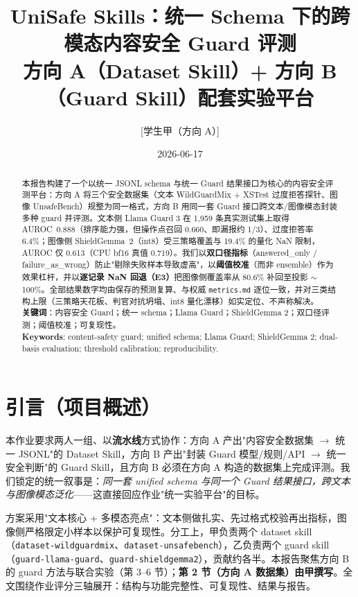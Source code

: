 \documentclass[11pt]{ctexart}
\title{\textbf{UniSafe Skills：统一 Schema 下的跨模态内容安全 Guard 评测}\\
\large 方向 A（Dataset Skill）+ 方向 B（Guard Skill）配套实验平台}
\author{[学生甲（方向 A）] \quad [学生乙（方向 B）]} %
\date{2026-06-17}
\begin{document}
\maketitle

\begin{abstract}
\noindent
本报告构建了一个以统一 JSONL schema 与统一 Guard 结果接口为核心的内容安全评测平台：方向 A 将三个安全数据集（文本 WildGuardMix + XSTest 过度拒答探针、图像 UnsafeBench）规整为同一格式，方向 B 用同一套 Guard 接口跨文本/图像模态封装多种 guard 并评测。文本侧 Llama Guard 3 在 1{,}959 条真实测试集上取得 AUROC~0.888（排序能力强，但操作点召回 0.660、即漏报约 1/3）、过度拒答率 6.4\%；图像侧 ShieldGemma~2（int8）受三策略覆盖与 19.4\% 的量化 NaN 限制，AUROC 仅 0.613（CPU bf16 真值 0.719）。我们以\textbf{双口径指标}（answered\_only / failure\_as\_wrong）防止"剔除失败样本导致虚高"，以\textbf{阈值校准}（而非 ensemble）作为效果杠杆，并以\textbf{逐记录 NaN 回退（E3）}把图像侧覆盖率从 80.6\% 补回至投影 $\sim$100\%。全部结果数字均由保存的预测复算、与权威 \texttt{metrics.md} 逐位一致，并对三类结构上限（三策略天花板、判官对抗坍塌、int8 量化漂移）如实定位、不声称解决。\\[0.4em]
\noindent\textbf{关键词}：内容安全 Guard；统一 schema；Llama Guard；ShieldGemma 2；双口径评测；阈值校准；可复现性。\\
\noindent\textbf{Keywords}: content-safety guard; unified schema; Llama Guard; ShieldGemma 2; dual-basis evaluation; threshold calibration; reproducibility.
\end{abstract}

\section{引言（项目概述）}
本作业要求两人一组、以\textbf{流水线}方式协作：方向 A 产出"内容安全数据集 $\to$ 统一 JSONL"的 Dataset Skill，方向 B 产出"封装 Guard 模型/规则/API $\to$ 统一安全判断"的 Guard Skill，且方向 B 必须在方向 A 构造的数据集上完成评测。我们锁定的统一叙事是：\emph{同一套 unified schema 与同一个 Guard 结果接口，跨文本与图像模态泛化}——这直接回应作业"统一实验平台"的目标。

方案采用"文本核心 + 多模态亮点"：文本侧做扎实、先过格式校验再出指标，图像侧严格限定小样本以保护可复现性。分工上，甲负责两个 dataset skill（\texttt{dataset-wildguardmix}、\texttt{dataset-unsafebench}），乙负责两个 guard skill（\texttt{guard-llama-guard}、\texttt{guard-shieldgemma2}），贡献约各半。本报告聚焦方向 B 的 guard 方法与联合实验（第 3--6 节）；\textbf{第 2 节（方向 A 数据集）由甲撰写}。全文围绕作业评分三轴展开：结构与功能完整性、可复现性、结果与报告。
\end{document}
